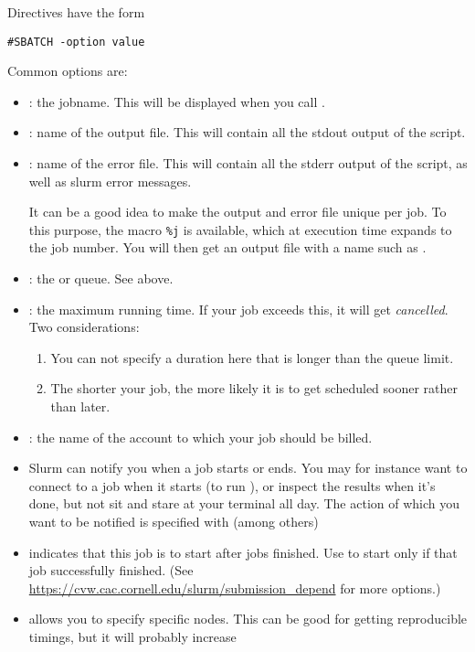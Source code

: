Directives have the form
\begin{verbatim}
#SBATCH -option value
\end{verbatim}
Common options are:
\begin{itemize}
\item {}: the jobname. This will be displayed when you call .
\item {}: name of the output file. This will contain all the stdout output of the script.
\item {}: name of the error file. This will contain all the stderr
  output of the script, as well as slurm error messages.

  It can be a good idea to make the output and error file unique per job.
  To this purpose, the macro \verb+%j+ is available, which at execution time
  expands to the job number. You will then get an output file with a
  name such as .
\item {}: the  or queue. See above.
\item {}: the maximum running time.
  If your job exceeds this, it will get
  \emph{cancelled}. Two considerations:
  \begin{enumerate}
  \item You can not specify a duration here that is longer than the queue limit.
  \item The shorter your job, the more likely it is to get scheduled sooner
    rather than later.
  \end{enumerate}
\item {}: the name of the account to which your job should be billed.
\item {} Slurm can notify you when a job starts or ends.
  You may for instance want to connect to a job when it starts
  (to run ),
  or inspect the results when it's done, but not sit and stare at your terminal all day.
  The action of which you want to be notified is specified with
  (among others)
\item {} indicates that this job is to
  start after jobs  finished. Use  to start only
  if that job successfully finished. (See
  \url{https://cvw.cac.cornell.edu/slurm/submission_depend} for more
  options.)
\item {} allows you to specify specific nodes. This can be
  good for getting reproducible timings, but it will probably increase

\end{itemize}

